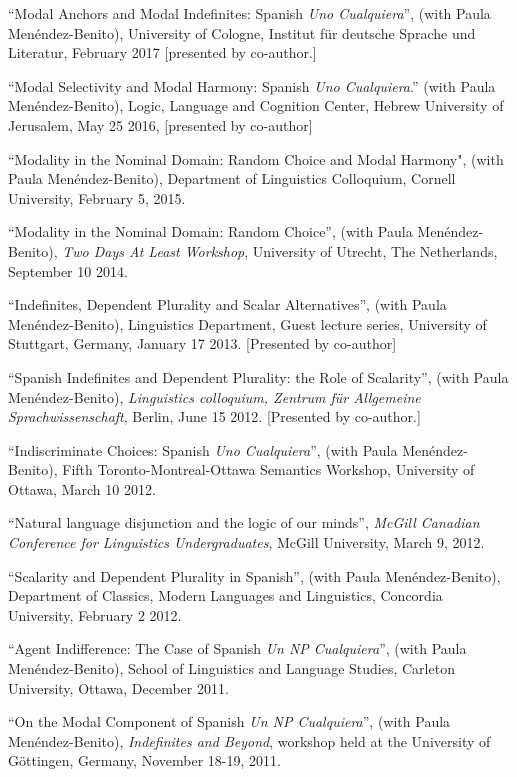 \documentclass[11pt]{article}
\begin{document}
``Modal Anchors and Modal Indefinites: Spanish \textit{Uno Cualquiera}'', (with Paula Men\'endez-Benito), University of Cologne, Institut f\"ur deutsche Sprache und Literatur, February 2017 [presented by co-author.]

``Modal Selectivity and Modal Harmony: Spanish \textit{Uno Cualquiera}.'' (with Paula Men\'endez-Benito), Logic, Language and Cognition Center, Hebrew University of Jerusalem, May 25 2016, [presented by co-author]

``Modality in the Nominal Domain: Random Choice and Modal Harmony", (with Paula Men\'endez-Benito), Department of Linguistics Colloquium, Cornell University, February 5, 2015.

``Modality in the Nominal Domain: Random Choice'',
(with Paula Men\'endez-Benito), \textit{Two Days At Least Workshop},
University of Utrecht, The Netherlands, September 10 2014.

``Indefinites, Dependent Plurality and Scalar
Alternatives'', (with Paula Men\'endez-Benito), Linguistics Department, Guest lecture series, University of Stuttgart, Germany, January 17 2013. [Presented by co-author]

``Spanish Indefinites and Dependent Plurality: the Role of
Scalarity'',  (with Paula Men\'endez-Benito), \textit{Linguistics colloquium, Zentrum f\"{u}r
  Allgemeine Sprachwissenschaft}, Berlin, June 15 2012. [Presented by co-author.]

``Indiscriminate Choices: Spanish \textit{Uno
  Cualquiera}'', (with Paula Men\'endez-Benito), Fifth Toronto-Montreal-Ottawa Semantics Workshop, University of
Ottawa, March 10 2012.

``Natural language disjunction and the logic of our
minds'', \textit{McGill Canadian Conference for Linguistics
  Undergraduates}, McGill University, March 9, 2012.

``Scalarity and Dependent Plurality in Spanish'', (with Paula Men\'endez-Benito),
Department of Classics, Modern Languages and Linguistics, Concordia
University, February 2 2012.

``Agent Indifference: The Case of Spanish \textit{Un NP
  Cualquiera}'', (with Paula Men\'endez-Benito), School of Linguistics and Language Studies, Carleton
University, Ottawa, December 2011. 

``On the Modal Component of Spanish \textit{Un NP
  Cualquiera}'', (with Paula Men\'endez-Benito), \textit{Indefinites
  and Beyond}, workshop held at the University of G\"{o}ttingen,
Germany, November 18-19, 2011.
\end{document}
